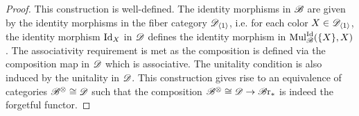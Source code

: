 \begin{proof}
    This construction is well-defined. 
    The identity morphisms in $\mathscr{B}$ are given by the identity morphisms in the
    fiber category $\mathscr{D}_{\langle 1 \rangle}$, i.e. for each color $X \in
    \mathscr{D}_{\langle 1 \rangle}$, the identity morphism $\operatorname{Id}_X$ in $\mathscr{D}$ defines the
    identity morphism in $\operatorname{Mul}_{\mathscr{B}}^{\operatorname{Id}}(\{X\}, X)$. The associativity
    requirement is met as the composition is defined via the composition map in
    $\mathscr{D}$ which is associative. The unitality condition is also induced by the
    unitality in $\mathscr{D}$. This construction gives rise to an equivalence of
    categories $\mathscr{B}^{\otimes} \cong \mathscr{D}$ such that the composition $\mathscr{B}^{\otimes} \cong \mathscr{D} \to \mathscr{B} \text{r}_{\ast}$
    is indeed the forgetful functor.
\end{proof}


